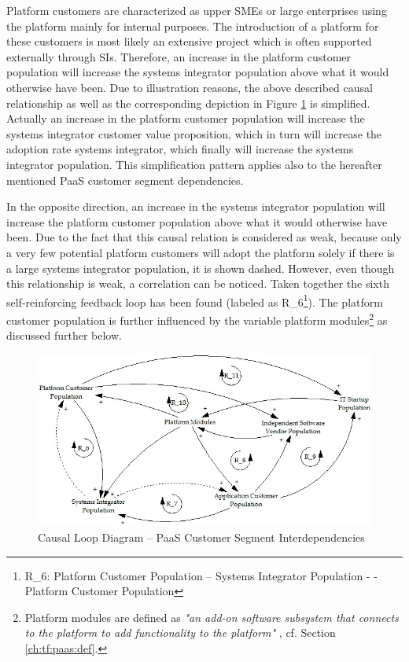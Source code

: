 Platform customers are characterized as upper \acp{SME} or large enterprises using the platform mainly for internal purposes. The introduction of a platform for these customers is most likely an extensive project which is often supported externally through \acp{SI}. Therefore, an increase in the platform customer population will increase the systems integrator population above what it would otherwise have been. Due to illustration reasons, the above described causal relationship as well as the corresponding depiction in Figure \ref{fig:cld_csi} is simplified. Actually an increase in the platform customer population will increase the systems integrator customer value proposition, which in turn will increase the adoption rate systems integrator, which finally will increase the systems integrator population. This simplification pattern applies also to the hereafter mentioned \ac{PaaS} customer segment dependencies.

In the opposite direction, an increase in the systems integrator population will increase the platform customer population above what it would otherwise have been. Due to the fact that this causal relation is considered as weak, because only a very few potential platform customers will adopt the platform solely if there is a large systems integrator population, it is shown dashed. However, even though this relationship is weak, a correlation can be noticed. Taken together the sixth self-reinforcing feedback loop has been found (labeled as R\_6\footnote{R\_6: Platform Customer Population -- Systems Integrator Population - - Platform Customer Population}). The platform customer population is further influenced by the variable platform modules\footnote{Platform modules are defined as \textit{"an add-on software subsystem that connects to the platform to add functionality to the platform"} \citep[p. 676]{Tiwana2010}, cf. Section \ref{ch:tf:paas:def}.} as discussed further below.

\begin{figure}[tb]
	\centering
	\includegraphics[width=\textwidth]{gfx/cld_customerSegmentInterdependencies}
	\caption{Causal Loop Diagram -- PaaS Customer Segment Interdependencies}
	\label{fig:cld_csi}
\end{figure}


